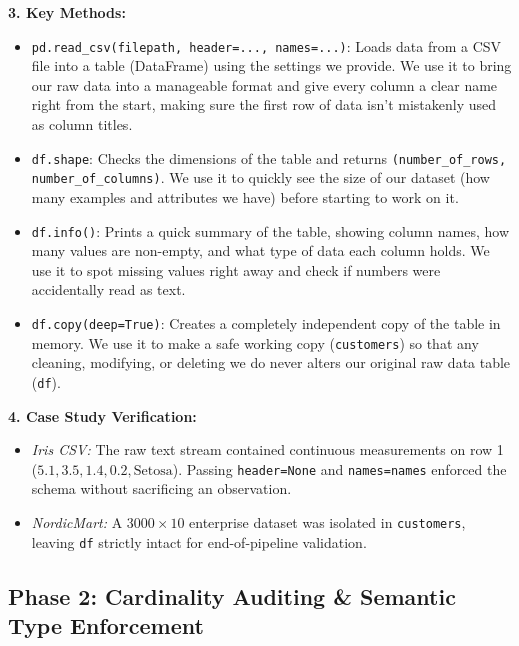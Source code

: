 \documentclass[11pt,a4paper]{article}
\begin{document}
\vspace{0.4em}
\noindent\textbf{3. Key Methods:}\par\vspace{0.2em}
\begin{itemize}[leftmargin=*]
    \item \lstinline!pd.read_csv(filepath, header=..., names=...)!: Loads data from a CSV file into a table (DataFrame) using the settings we provide. We use it to bring our raw data into a manageable format and give every column a clear name right from the start, making sure the first row of data isn't mistakenly used as column titles.
    \item \lstinline!df.shape!: Checks the dimensions of the table and returns \lstinline!(number_of_rows, number_of_columns)!. We use it to quickly see the size of our dataset (how many examples and attributes we have) before starting to work on it.
    \item \lstinline!df.info()!: Prints a quick summary of the table, showing column names, how many values are non-empty, and what type of data each column holds. We use it to spot missing values right away and check if numbers were accidentally read as text.
    \item \lstinline!df.copy(deep=True)!: Creates a completely independent copy of the table in memory. We use it to make a safe working copy (\lstinline!customers!) so that any cleaning, modifying, or deleting we do never alters our original raw data table (\lstinline!df!).
\end{itemize}

\vspace{0.4em}
\noindent\textbf{4. Case Study Verification:}\par\vspace{0.2em}
\begin{itemize}[leftmargin=*]
    \item \textit{Iris CSV:} The raw text stream contained continuous measurements on row 1 ($5.1, 3.5, 1.4, 0.2, \text{Setosa}$). Passing \lstinline!header=None! and \lstinline!names=names! enforced the schema without sacrificing an observation.
    \item \textit{NordicMart:} A $3000 \times 10$ enterprise dataset was isolated in \lstinline!customers!, leaving \lstinline!df! strictly intact for end-of-pipeline validation.
\end{itemize}

\subsection*{Phase 2: Cardinality Auditing \& Semantic Type Enforcement}
\end{document}
